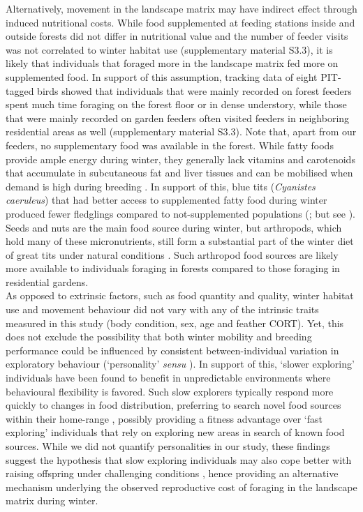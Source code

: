 \documentclass[10pt, twoside]{book} %
\begin{document}
Alternatively, movement in the landscape matrix may have indirect effect through induced nutritional costs. While food supplemented at feeding stations inside and outside forests did not differ in nutritional value and the number of feeder visits was not correlated to winter habitat use (supplementary material S3.3), it is likely that individuals that foraged more in the landscape matrix fed more on supplemented food. In support of this assumption, tracking data of eight PIT-tagged birds showed that individuals that were mainly recorded on forest feeders spent much time foraging on the forest floor or in dense understory, while those that were mainly recorded on garden feeders often visited feeders in neighboring residential areas as well (supplementary material S3.3). Note that, apart from our feeders, no supplementary food was available in the forest. While fatty foods provide ample energy during winter, they generally lack vitamins and carotenoids that accumulate in subcutaneous fat and liver tissues and can be mobilised when demand is high during breeding \citep{Plummer2013}. In support of this, blue tits (\textit{Cyanistes caeruleus}) that had better access to supplemented fatty food during winter produced fewer fledglings compared to not-supplemented populations (\citealt{Plummer2013a}; but see \citealt{Robb2008a, Crates2016}). Seeds and nuts are the main food source during winter, but arthropods, which hold many of these micronutrients, still form a substantial part of the winter diet of great tits under natural conditions \citep{Velky2011}. Such arthropod food sources are likely more available to individuals foraging in forests compared to those foraging in residential gardens.\\

As opposed to extrinsic factors, such as food quantity and quality, winter habitat use and movement behaviour did not vary with any of the intrinsic traits measured in this study (body condition, sex, age and feather CORT). Yet, this does not exclude the possibility that both winter mobility and breeding performance could be influenced by consistent between-individual variation in exploratory behaviour (`personality' \textit{sensu} \citealt{Dingemanse2004, Spiegel2017, Both2005}). In support of this, `slower exploring' individuals have been found to benefit in unpredictable environments where behavioural flexibility is favored. Such slow explorers typically respond more quickly to changes in food distribution, preferring to search novel food sources within their home-range \citep{Verbeek1994, VanOverveld2010, Arvidsson2016}, possibly providing a fitness advantage over `fast exploring' individuals that rely on exploring new areas in search of known food sources. While we did not quantify personalities in our study, these findings suggest the hypothesis that slow exploring individuals may also cope better with raising offspring under challenging conditions \citep{Both2005}, hence providing an alternative mechanism underlying the observed reproductive cost of foraging in the landscape matrix during winter.\\
\end{document}
